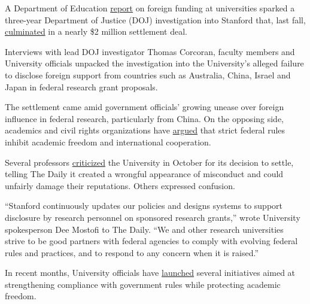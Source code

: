 \documentclass{article}%
\title{\huge{\textbf{DOJ investigator unveils Stanford’s $1.9 million settlement deal}}}%
\author{\href{https://stanforddaily.com/author/georgeporteous/}{George Porteous}}%
\date{March 8, 2024, 12:54 a.m.}%
\begin{document}
%
\large%
\maketitle%

\par{A Department of Education \href{https://stanforddaily.com/2020/11/24/education-department-probes-stanfords-reporting-of-chinese-financial-gifts/}{report} on foreign funding at universities sparked a three-year Department of Justice (DOJ) investigation into Stanford that, last fall, \href{https://stanforddaily.com/2023/10/27/professors-raise-questions-over-1-9-million-stanford-doj-settlement/}{culminated} in a nearly \$2 million settlement deal.}\\
\par{Interviews with lead DOJ investigator Thomas Corcoran, faculty members and University officials unpacked the investigation into the University’s alleged failure to disclose foreign support from countries such as Australia, China, Israel and Japan in federal research grant proposals.}\\
\par{The settlement came amid government officials’ growing unease over foreign influence in federal research, particularly from China. On the opposing side, academics and civil rights organizations have \href{https://www.pnas.org/doi/10.1073/pnas.2314168120}{argued} that strict federal rules inhibit academic freedom and international cooperation. }\\
\par{Several professors \href{https://stanforddaily.com/2023/10/27/professors-raise-questions-over-1-9-million-stanford-doj-settlement/}{criticized} the University in October for its decision to settle, telling The Daily it created a wrongful appearance of misconduct and could unfairly damage their reputations. Others expressed confusion. }\\
\par{“Stanford continuously updates our policies and designs systems to support disclosure by research personnel on sponsored research grants,” wrote University spokesperson Dee Mostofi to The Daily. “We and other research universities strive to be good partners with federal agencies to comply with evolving federal rules and practices, and to respond to any concern when it is raised.” }\\
\par{In recent months, University officials have \href{https://stanforddaily.com/2024/01/30/faculty-debate-undue-foreign-influence-in-research/}{launched} several initiatives aimed at strengthening compliance with government rules while protecting academic freedom.}\\
\end{document}
